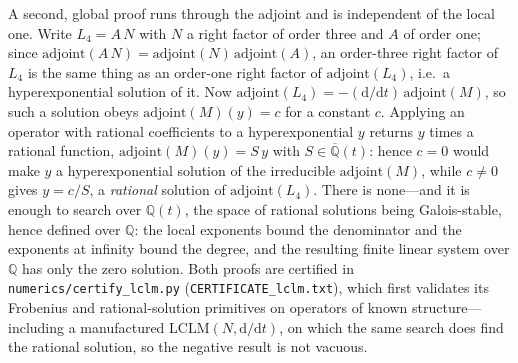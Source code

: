 \documentclass[11pt]{article}
\newcommand{\rmd}{\mathrm{d}}
\theoremstyle{plain}
\theoremstyle{remark}
\begin{document}
A second, global proof runs through the adjoint and is independent of the local one. Write $L_4=A\,N$ with $N$
a right factor of order three and $A$ of order one; since $\mathrm{adjoint}(A\,N)=\mathrm{adjoint}(N)\,
\mathrm{adjoint}(A)$, an order-three right factor of $L_4$ is the same thing as an order-one right factor of
$\mathrm{adjoint}(L_4)$, i.e.\ a hyperexponential solution of it. Now
$\mathrm{adjoint}(L_4)=-(\rmd/\rmd t)\,\mathrm{adjoint}(M)$, so such a solution obeys
$\mathrm{adjoint}(M)(y)=c$ for a constant $c$. Applying an operator with rational coefficients to a
hyperexponential $y$ returns $y$ times a rational function, $\mathrm{adjoint}(M)(y)=S\,y$ with
$S\in\overline{\mathbb{Q}}(t)$: hence $c=0$ would make $y$ a hyperexponential solution of the irreducible
$\mathrm{adjoint}(M)$, while $c\neq0$ gives $y=c/S$, a \emph{rational} solution of $\mathrm{adjoint}(L_4)$.
There is none---and it is enough to search over $\mathbb{Q}(t)$, the space of rational solutions being
Galois-stable, hence defined over $\mathbb{Q}$: the local exponents bound the denominator and the exponents at
infinity bound the degree, and the resulting finite linear system over $\mathbb{Q}$ has only the zero solution. Both proofs are certified in
\texttt{numerics/certify\_lclm.py} (\texttt{CERTIFICATE\_lclm.txt}), which first validates its Frobenius and
rational-solution primitives on operators of known structure---including a manufactured
$\mathrm{LCLM}(N,\rmd/\rmd t)$, on which the same search does find the rational solution, so the negative
result is not vacuous.
\end{document}
